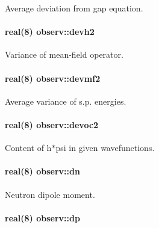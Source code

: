 Average deviation from gap equation. 

\paragraph[{\texorpdfstring{devh2}{devh2}}]{\setlength{\rightskip}{0pt plus 5cm}real(8) observ\+::devh2}\hypertarget{namespaceobserv_ae9229ef6dc10115d9fe75d1388132b7d}{}\label{namespaceobserv_ae9229ef6dc10115d9fe75d1388132b7d}


Variance of mean-\/field operator. 

\paragraph[{\texorpdfstring{devmf2}{devmf2}}]{\setlength{\rightskip}{0pt plus 5cm}real(8) observ\+::devmf2}\hypertarget{namespaceobserv_aca69c157018bf487e453d1813641ba01}{}\label{namespaceobserv_aca69c157018bf487e453d1813641ba01}


Average variance of s.\+p. energies. 

\paragraph[{\texorpdfstring{devoc2}{devoc2}}]{\setlength{\rightskip}{0pt plus 5cm}real(8) observ\+::devoc2}\hypertarget{namespaceobserv_a64f340dc1105ba5ed8e16d357001225b}{}\label{namespaceobserv_a64f340dc1105ba5ed8e16d357001225b}


Content of h$\ast$psi in given wavefunctions. 

\paragraph[{\texorpdfstring{dn}{dn}}]{\setlength{\rightskip}{0pt plus 5cm}real(8) observ\+::dn}\hypertarget{namespaceobserv_aa7d55b64ce5daf1649ee9f05b95088fc}{}\label{namespaceobserv_aa7d55b64ce5daf1649ee9f05b95088fc}


Neutron dipole moment. 

\paragraph[{\texorpdfstring{dp}{dp}}]{\setlength{\rightskip}{0pt plus 5cm}real(8) observ\+::dp}\hypertarget{namespaceobserv_aa2afb41c7a18f5680744a85b000d7861}{}\label{namespaceobserv_aa2afb41c7a18f5680744a85b000d7861}


